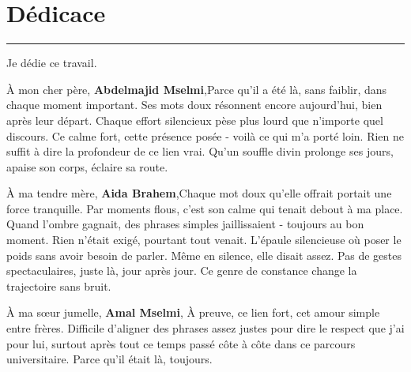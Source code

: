 \chapter*{Dédicace}

\selectfont
\linespread{1.0}
\thispagestyle{plain}

\vspace*{0.5cm} %

\noindent\rule{\textwidth}{2pt}

\vspace{0.1cm} %

{\large Je dédie ce travail.}

\vspace{0.2cm} %

À mon cher père, \textbf{Abdelmajid Mselmi},Parce qu’il a été là, sans faiblir, dans chaque moment important. Ses mots doux résonnent encore aujourd’hui, bien après leur départ. Chaque effort silencieux pèse plus lourd que n’importe quel discours. Ce calme fort, cette présence posée - voilà ce qui m’a porté loin. Rien ne suffit à dire la profondeur de ce lien vrai. Qu’un souffle divin prolonge ses jours, apaise son corps, éclaire sa route.

\vspace{0.2cm} %

À ma tendre mère, \textbf{Aida Brahem},Chaque mot doux qu'elle offrait portait une force tranquille. Par moments flous, c’est son calme qui tenait debout à ma place. Quand l’ombre gagnait, des phrases simples jaillissaient - toujours au bon moment. Rien n’était exigé, pourtant tout venait. L’épaule silencieuse où poser le poids sans avoir besoin de parler. Même en silence, elle disait assez. Pas de gestes spectaculaires, juste là, jour après jour. Ce genre de constance change la trajectoire sans bruit.

\vspace{0.2cm}

À ma sœur jumelle, \textbf{Amal Mselmi}, À preuve, ce lien fort, cet amour simple entre frères. Difficile d’aligner des phrases assez justes pour dire le respect que j’ai pour lui, surtout après tout ce temps passé côte à côte dans ce parcours universitaire. Parce qu’il était là, toujours.
\vspace{0.2cm}


